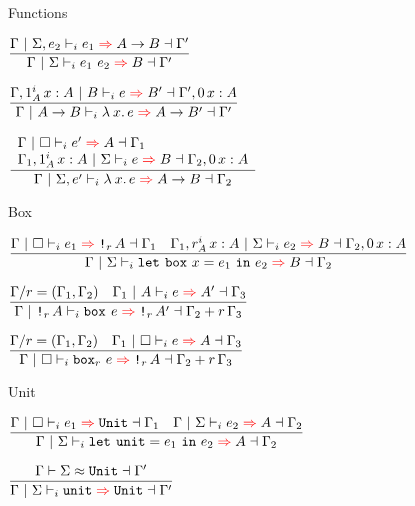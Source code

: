 \documentclass{beamer}
\begin{document}
\begin{frame}{Functions}

\begin{center}
  $\infrule{\infer{\Gamma}{\arghint{\Sigma}{e_2}}{e_1}{\Fun{A}{B}}{\Gamma'}}{\infer{\Gamma}{\Sigma}{\app{e_1}{e_2}}{B}{\Gamma'}}$

  \vspace{2em}

  $\infrule{\infer{\extend{\Gamma}[\totalqty{\One}{A}]{x}{A}}{B}{e}{B'}{\extend{\Gamma'}[\Zero]{x}{A}}}{\infer{\Gamma}{\typehint{\Fun{A}{B}}}{\fun{x}{e}}{\Fun{A}{B'}}{\Gamma'}}$

  \vspace{2em}

  $\infrule{\begin{array}{l} \infer{\Gamma}{\emptyhint}{e'}{A}{\Gamma_1} \\ \infer{\extend{\Gamma_1}[\totalqty{\One}{A}]{x}{A}}{\Sigma}{e}{B}{\extend{\Gamma_2}[\Zero]{x}{A}} \end{array}}{\infer{\Gamma}{\arghint{\Sigma}{e'}}{\fun{x}{e}}{\Fun{A}{B}}{\Gamma_2}}$
\end{center}

\end{frame}

\begin{frame}{Box}

\begin{center}
  $\infrule{\infer{\Gamma}{\emptyhint}{e_1}{\Box[r]{A}}{\Gamma_1} \quad \infer{\extend{\Gamma_1}[\totalqty{r}{A}]{x}{A}}{\Sigma}{e_2}{B}{\extend{\Gamma_2}[\Zero]{x}{A}}}{\infer{\Gamma}{\Sigma}{\boxelim{x}{e_1}{e_2}}{B}{\Gamma_2}}$

  \vspace{2em}

  $\infrule{\divctx{\Gamma}{r} = (\Gamma_1, \Gamma_2) \quad \infer{\Gamma_1}{\typehint{A}}{e}{A'}{\Gamma_3}}{\infer{\Gamma}{\typehint{\Box[r]{A}}}{\boxintro{e}}{\Box[r]{A'}}{\addctx{\Gamma_2}{\scalectx{r}{\Gamma_3}}}}$

  \vspace{2em}

  $\infrule{\divctx{\Gamma}{r} = (\Gamma_1, \Gamma_2) \quad \infer{\Gamma_1}{\emptyhint}{e}{A}{\Gamma_3}}{\infer{\Gamma}{\emptyhint}{\boxintro[r]{e}}{\Box[r]{A}}{\addctx{\Gamma_2}{\scalectx{r}{\Gamma_3}}}}$
\end{center}

\end{frame}

\begin{frame}{Unit}

\begin{center}
  $\infrule{\infer{\Gamma}{\emptyhint}{e_1}{\Unit}{\Gamma_1} \quad \infer{\Gamma}{\Sigma}{e_2}{A}{\Gamma_2}}{\infer{\Gamma}{\Sigma}{\unitelim{e_1}{e_2}}{A}{\Gamma_2}}$

  \vspace{2em}

  $\infrule{\compat{\Gamma}{\Sigma}{\Unit}{\Gamma'}}{\infer{\Gamma}{\Sigma}{\unit}{\Unit}{\Gamma'}}$
\end{center}

\end{frame}
\end{document}
